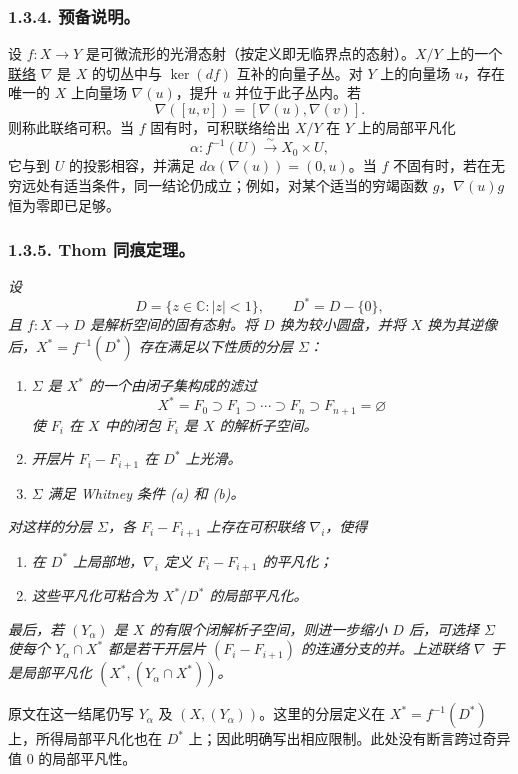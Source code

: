 \subsubsection*{1.3.4. 预备说明。}
设 $f:X\longrightarrow Y$ 是可微流形的光滑态射（按定义即无临界点的态射）。$X/Y$ 上的一个\underline{联络} $\nabla$ 是 $X$ 的切丛中与 $\ker(df)$ 互补的向量子丛。对 $Y$ 上的向量场 $u$，存在唯一的 $X$ 上向量场 $\nabla(u)$，提升 $u$ 并位于此子丛内。若
\[
\nabla([u,v])=[\nabla(u),\nabla(v)].
\]
则称此联络可积。当 $f$ 固有时，可积联络给出 $X/Y$ 在 $Y$ 上的局部平凡化
\[
\alpha:f^{-1}(U)\xrightarrow{\ \sim\ }X_0\times U,
\]
它与到 $U$ 的投影相容，并满足 $d\alpha(\nabla(u))=(0,u)$。当 $f$ 不固有时，若在无穷远处有适当条件，同一结论仍成立；例如，对某个适当的穷竭函数 $g$，$\nabla(u)g$ 恒为零即已足够。

\subsubsection*{1.3.5. Thom 同痕定理。}
\textit{设
\[
D=\{z\in\mathbb C:|z|<1\},
\qquad D^*=D-\{0\},
\]
且 $f:X\longrightarrow D$ 是解析空间的固有态射。将 $D$ 换为较小圆盘，并将 $X$ 换为其逆像后，$X^*=f^{-1}(D^*)$ 存在满足以下性质的分层 $\Sigma$：}

\begin{enumerate}[label=(\alph*),leftmargin=2.7em]
\item \textit{$\Sigma$ 是 $X^*$ 的一个由闭子集构成的滤过
\[
X^*=F_0\supset F_1\supset\cdots\supset F_n
\supset F_{n+1}=\varnothing
\]
使 $F_i$ 在 $X$ 中的闭包 $\overline F_i$ 是 $X$ 的解析子空间。}

\item \textit{开层片 $F_i-F_{i+1}$ 在 $D^*$ 上光滑。}

\item \textit{$\Sigma$ 满足 Whitney 条件 (a) 和 (b)。}
\end{enumerate}

\textit{对这样的分层 $\Sigma$，各 $F_i-F_{i+1}$ 上存在可积联络 $\nabla_i$，使得}

\begin{enumerate}[label=(\roman*),leftmargin=2.7em]
\item \textit{在 $D^*$ 上局部地，$\nabla_i$ 定义 $F_i-F_{i+1}$ 的平凡化；}

\item \textit{这些平凡化可粘合为 $X^*/D^*$ 的局部平凡化。}
\end{enumerate}

\textit{最后，若 $(Y_\alpha)$ 是 $X$ 的有限个闭解析子空间，则进一步缩小 $D$ 后，可选择 $\Sigma$ 使每个 $Y_\alpha\cap X^*$ 都是若干开层片 $(F_i-F_{i+1})$ 的连通分支的并。上述联络 $\nabla$ 于是局部平凡化 $(X^*,(Y_\alpha\cap X^*))$。}
\begin{editorialnote}
原文在这一结尾仍写 $Y_\alpha$ 及 $(X,(Y_\alpha))$。这里的分层定义在 $X^*=f^{-1}(D^*)$ 上，所得局部平凡化也在 $D^*$ 上；因此明确写出相应限制。此处没有断言跨过奇异值 $0$ 的局部平凡性。
\end{editorialnote}

